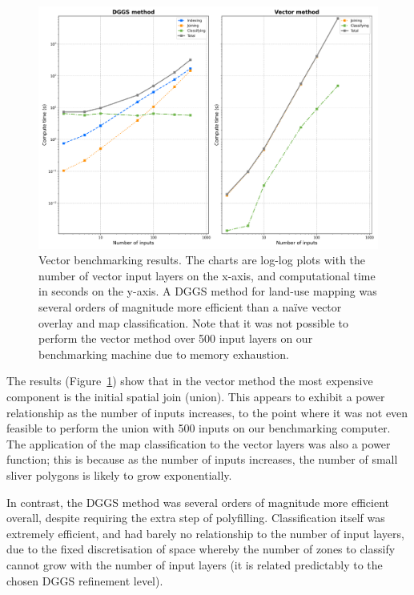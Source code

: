 \documentclass[]{interact}
\theoremstyle{plain}%
\theoremstyle{definition}
\theoremstyle{remark}
\begin{document}
\begin{figure}[t]
    \centering
    \includegraphics[width=0.85\linewidth]{images/vector-results.png}
    \caption{Vector benchmarking results. The charts are log-log plots with the number of vector input layers on the x-axis, and computational time in seconds on the y-axis. A \ac{DGGS} method for land-use mapping was several orders of magnitude more efficient than a na\"{i}ve vector overlay and map classification. Note that it was not possible to perform the vector method over 500 input layers on our benchmarking machine due to memory exhaustion.}
    \label{fig:BenchmarkVect}
\end{figure}

The results (Figure~\ref{fig:BenchmarkVect}) show that in the vector method the most expensive component is the initial spatial join (union). This appears to exhibit a power relationship as the number of inputs increases, to the point where it was not even feasible to perform the union with 500 inputs on our benchmarking computer. The application of the map classification to the vector layers was also a power function; this is because as the number of inputs increases, the number of small sliver polygons is likely to grow exponentially.

In contrast, the \ac{DGGS} method was several orders of magnitude more efficient overall, despite requiring the extra step of polyfilling. Classification itself was extremely efficient, and had barely no relationship to the number of input layers, due to the fixed discretisation of space whereby the number of zones to classify cannot grow with the number of input layers (it is related predictably to the chosen \ac{DGGS} refinement level).
\end{document}
